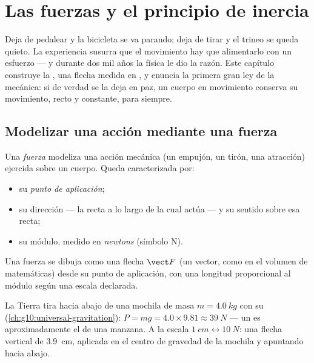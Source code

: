 \chapter{Las fuerzas y el principio de inercia}\label{ch:g10:inertia}

Deja de pedalear y la bicicleta se va parando; deja de tirar y el trineo
se queda quieto. La experiencia susurra que el movimiento hay que
alimentarlo con un esfuerzo --- y durante dos mil años la física le dio
la razón. Este capítulo construye la , una flecha medida en
, y enuncia la primera gran ley de la mecánica: si de verdad se
la deja en paz, un cuerpo en movimiento conserva su movimiento, recto y
constante, para siempre.

\section{Modelizar una acción mediante una fuerza}

\begin{definition}[Fuerza]\label{def:g10:inertia:force}
Una \emph{fuerza} modeliza una acción mecánica (un empujón,
un tirón, una atracción) ejercida sobre un cuerpo. Queda caracterizada
por:
\begin{itemize}
  \item su \emph{punto de aplicación};
  \item su dirección --- la recta a lo largo de la cual actúa --- y su
        sentido sobre esa recta;
  \item su módulo, medido en \emph{newtons} (símbolo
        \unit{N}).
\end{itemize}
Una fuerza se dibuja como una flecha $\vect F$ (un vector, como en el
volumen de matemáticas) desde su punto de aplicación, con una longitud
proporcional al módulo según una escala declarada.
\end{definition}

\begin{example}\label{ex:g10:inertia:schoolbag}
La Tierra tira hacia abajo de una mochila de masa $m = \qty{4.0}{kg}$
con su  (\cref{ch:g10:universal-gravitation}):
$P = mg = 4.0 \times 9.81 \approx \qty{39}{N}$ --- un  es
aproximadamente el  de una manzana. A la escala
$\qty{1}{cm} \leftrightarrow \qty{10}{N}$: una flecha vertical de
\qty{3.9}{cm}, aplicada en el centro de gravedad de la mochila y
apuntando hacia abajo.
\end{example}

